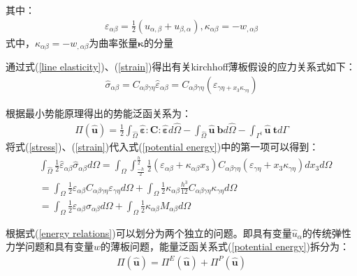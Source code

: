 其中：
\begin{equation}
\begin{split}
    \varepsilon_{\alpha\beta}=\frac{1}{2}(u_{\alpha,\beta}+u_{\beta,\alpha}),\kappa_{\alpha\beta}=-w_{,\alpha\beta}
\end{split}
\end{equation}
式中，$\kappa_{\alpha\beta}=-w_{,\alpha\beta}$为曲率张量$\pmb{\kappa}$的分量\par
通过式(\ref{line elasticity})、(\ref{strain})得出有关kirchhoff薄板假设的应力关系式如下：
\begin{equation}\label{stress}
\begin{split}
    \hat{\sigma}_{\alpha\beta}=C_{\alpha\beta\gamma\eta}\hat{\varepsilon}_{\alpha\beta}=C_{\alpha\beta\gamma\eta}(\varepsilon_{\gamma\eta+x_3\kappa_{\gamma\eta}})
\end{split}
\end{equation}\par
根据最小势能原理得出的势能泛函关系为：
\begin{equation}\label{potential energy}
\begin{split}
    \Pi(\hat{\pmb{u}})=\frac{1}{2}\int_{\hat{\Omega}}\hat{\pmb{\varepsilon}}\pmb{:}\pmb{C}\pmb{:}\hat{\pmb{\varepsilon}}d\hat{\Omega}-\int_{\hat{\Omega}}\hat{\pmb{u}}~\pmb{b}d\hat{\Omega}-\int_{\Gamma^t}\hat{\pmb{u}}~\pmb{t}d\Gamma
\end{split}
\end{equation}
将式(\ref{stress})、(\ref{strain})代入式(\ref{potential energy})中的第一项可以得到：
\begin{equation}\label{energy relations}
\begin{split}
&\int_{\hat{\Omega}}\frac{1}{2}\hat{\varepsilon}_{\alpha\beta}\hat{\sigma}_{\alpha\beta}d\Omega=\int_{\Omega}\int_{\frac{-h}{2}}^{\frac{h}{2}}\frac{1}{2}(\varepsilon_{\alpha\beta}+\kappa_{\alpha\beta}x_3)C_{\alpha\beta\gamma\eta}(\varepsilon_{\gamma\eta}+x_3\kappa_{\gamma\eta})dx_3d\Omega\\
&=\int_{\Omega}\frac{1}{2}\varepsilon_{\alpha\beta}C_{\alpha\beta\gamma\eta}\varepsilon_{\gamma\eta}d\Omega+\int_{\Omega}\frac{1}{2}\kappa_{\alpha\beta}\frac{h^3}{12}C_{\alpha\beta\gamma\eta}\kappa_{\gamma\eta}d\Omega\\
&=\int_{\Omega}\frac{1}{2}\varepsilon_{\alpha\beta}\sigma_{\alpha\beta}d\Omega+\int_{\Omega}\frac{1}{2}\kappa_{\alpha\beta}M_{\alpha\beta}d\Omega
\end{split}
\end{equation}\par
根据式(\ref{energy relations})可以划分为两个独立的问题。即具有变量$\hat{u}_{\alpha}$的传统弹性力学问题和具有变量$w$的薄板问题，能量泛函关系式(\ref{potential energy})拆分为：
\begin{equation}
\begin{split}
\Pi(\hat{\pmb{u}})=\Pi^E(\hat{\pmb{u}})+\Pi^P(\hat{\pmb{u}})
\end{split}
\end{equation}
